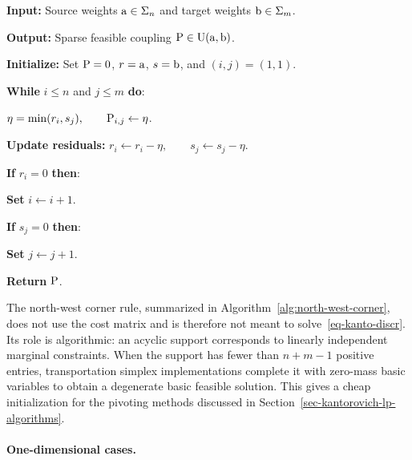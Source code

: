\begin{alg}\label{alg:north-west-corner}
\textbf{Input:} Source weights $\a\in\simplex_n$ and target weights $\b\in\simplex_m$.

\textbf{Output:} Sparse feasible coupling $\P\in\CouplingsD(\a,\b)$.

\textbf{Initialize:} Set $\P=0$, $r=\a$, $s=\b$, and $(i,j)=(1,1)$.

\textbf{While} $i\leq n$ and $j\leq m$ \textbf{do}:
\begin{algblock}
\(\eta=\min(r_i,s_j), \qquad \P_{i,j}\leftarrow \eta\).

\textbf{Update residuals:}
\(r_i\leftarrow r_i-\eta, \qquad s_j\leftarrow s_j-\eta\).

\textbf{If} $r_i=0$ \textbf{then}:
\begin{algblock}

\textbf{Set} $i\leftarrow i+1$.

\end{algblock}
\textbf{If} $s_j=0$ \textbf{then}:
\begin{algblock}

\textbf{Set} $j\leftarrow j+1$.

\end{algblock}
\end{algblock}
\algreturnskip
\textbf{Return} $\P$.
\end{alg}

The north-west corner rule, summarized in Algorithm~\ref{alg:north-west-corner}, does not use the cost matrix and is therefore not meant to solve~\eqref{eq-kanto-discr}. Its role is algorithmic: an acyclic support corresponds to linearly independent marginal constraints. When the support has fewer than $n+m-1$ positive entries, transportation simplex implementations complete it with zero-mass basic variables to obtain a degenerate basic feasible solution. This gives a cheap initialization for the pivoting methods discussed in Section~\ref{sec-kantorovich-lp-algorithms}.

\paragraph{One-dimensional cases.}

